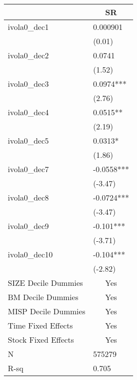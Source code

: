 \begin{tabular}{ll}
\toprule
        & \multicolumn{1}{c}{SR} \\
\midrule
ivola0_dec1 & 0.000901 \\
        & (0.01) \\
ivola0_dec2 & 0.0741 \\
        & (1.52) \\
ivola0_dec3 & 0.0974*** \\
        & (2.76) \\
ivola0_dec4 & 0.0515** \\
        & (2.19) \\
ivola0_dec5 & 0.0313* \\
        & (1.86) \\
ivola0_dec7 & -0.0558*** \\
        & (-3.47) \\
ivola0_dec8 & -0.0724*** \\
        & (-3.47) \\
ivola0_dec9 & -0.101*** \\
        & (-3.71) \\
ivola0_dec10 & -0.104*** \\
        & (-2.82) \\
\midrule
SIZE Decile Dummies & \multicolumn{1}{c}{Yes} \\
BM Decile Dummies & \multicolumn{1}{c}{Yes} \\
MISP Decile Dummies & \multicolumn{1}{c}{Yes} \\
Time Fixed Effects & \multicolumn{1}{c}{Yes} \\
Stock Fixed Effects & \multicolumn{1}{c}{Yes} \\
N       & 575279 \\
R-sq    & 0.705 \\
\bottomrule
\end{tabular}%
